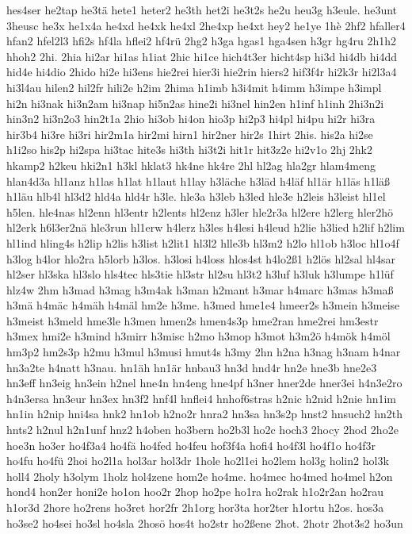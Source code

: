 {hes4ser
he2tap
he3tä
hete1
heter2
he3th
het2i
he3t2s
he2u
heu3g
h3eule.
he3unt
3heusc
he3x
he1x4a
he4xd
he4xk
he4xl
2he4xp
he4xt
hey2
he1ye
1hè
2hf2
hfaller4
hfan2
hfel2l3
hfi2s
hf4la
hflei2
hf4rü
2hg2
h3ga
hgas1
hga4sen
h3gr
hg4ru
2h1h2
hhoh2
2hi.
2hia
hi2ar
hi1as
h1iat
2hic
hi1ce
hich4t3er
hicht4sp
hi3d
hi4db
hi4dd
hid4e
hi4dio
2hido
hi2e
hi3ens
hie2rei
hier3i
hie2rin
hiers2
hif3f4r
hi2k3r
hi2l3a4
hi3l4au
hilen2
hil2fr
hili2e
h2im
2hima
h1imb
h3i4mit
h4imm
h3impe
h3impl
hi2n
hi3nak
hi3n2am
hi3nap
hi5n2as
hine2i
hi3nel
hin2en
h1inf
h1inh
2hi3n2i
hin3n2
hi3n2o3
hin2t1a
2hio
hi3ob
hi4on
hio3p
hi2p3
hi4pl
hi4pu
hi2r
hi3ra
hir3b4
hi3re
hi3ri
hir2m1a
hir2mi
hirn1
hir2ner
hir2s
1hirt
2his.
his2a
hi2se
h1i2so
his2p
hi2spa
hi3tac
hite3s
hi3th
hi3t2i
hit1r
hit3z2e
hi2v1o
2hj
2hk2
hkamp2
h2keu
hki2n1
h3kl
hklat3
hk4ne
hk4re
2hl
hl2ag
hla2gr
hlam4meng
hlan4d3a
hl1anz
h1las
h1lat
h1laut
h1lay
h3läche
h3läd
h4läf
hl1är
h1läs
h1läß
h1läu
hlb4l
hl3d2
hld4a
hld4r
h3le.
hle3a
h3leb
h3led
hle3e
h2leis
h3leist
hl1el
h5len.
hle4nas
hl2enn
hl3entr
h2lents
hl2enz
h3ler
hle2r3a
hl2ere
h2lerg
hler2hö
hl2erk
h6l3er2nä
hle3run
hl1erw
h4lerz
h3les
h4lesi
h4leud
h2lie
h3lied
h2lif
h2lim
hl1ind
hling4s
h2lip
h2lis
h3list
h2lit1
hl3l2
hlle3b
hl3m2
h2lo
hl1ob
h3loc
hl1o4f
h3log
h4lor
hlo2ra
h5lorb
h3los.
h3losi
h4loss
hlos4st
h4lo2ß1
h2lös
hl2sal
hl4sar
hl2ser
hl3ska
hl3slo
hls4tec
hls3tie
hl3str
hl2su
hl3t2
h3luf
h3luk
h3lumpe
h1lüf
hlz4w
2hm
h3mad
h3mag
h3m4ak
h3man
h2mant
h3mar
h4marc
h3mas
h3maß
h3mä
h4mäc
h4mäh
h4mäl
hm2e
h3me.
h3med
hme1e4
hmeer2s
h3mein
h3meise
h3meist
h3meld
hme3le
h3men
hmen2s
hmen4s3p
hme2ran
hme2rei
hm3estr
h3mex
hmi2e
h3mind
h3mirr
h3misc
h2mo
h3mop
h3mot
h3m2ö
h4mök
h4möl
hm3p2
hm2s3p
h2mu
h3mul
h3musi
hmut4s
h3my
2hn
h2na
h3nag
h3nam
h4nar
hn3a2te
h4natt
h3nau.
hn1äh
hn1är
hnbau3
hn3d
hnd4r
hn2e
hne3b
hne2e3
hn3eff
hn3eig
hn3ein
h2nel
hne4n
hn4eng
hne4pf
h3ner
hner2de
hner3ei
h4n3e2ro
h4n3ersa
hn3eur
hn3ex
hn3f2
hnf4l
hnflei4
hnhof6stras
h2nic
h2nid
h2nie
hn1im
hn1in
h2nip
hni4sa
hnk2
hn1ob
h2no2r
hnra2
hn3sa
hn3s2p
hnst2
hnsuch2
hn2th
hnts2
h2nul
h2n1unf
hnz2
h4oben
ho3bern
ho2b3l
ho2c
hoch3
2hocy
2hod
2ho2e
hoe3n
ho3er
ho4f3a4
ho4fä
ho4fed
ho4feu
hof3f4a
hofi4
ho4f3l
ho4f1o
ho4f3r
ho4fu
ho4fü
2hoi
ho2l1a
hol3ar
hol3dr
1hole
ho2l1ei
ho2lem
hol3g
holin2
hol3k
holl4
2holy
h3olym
1holz
hol4zene
hom2e
ho4me.
ho4mec
ho4med
ho4mel
h2on
hond4
hon2er
honi2e
ho1on
hoo2r
2hop
ho2pe
ho1ra
ho2rak
h1o2r2an
ho2rau
h1or3d
2hore
ho2rens
ho3ret
hor2fr
2h1org
hor3ta
hor2ter
h1ortu
h2os.
hos3a
ho3se2
ho4sei
ho3sl
ho4sla
2hosö
hos4t
ho2str
ho2ßene
2hot.
2hotr
2hot3s2
ho3un
}
